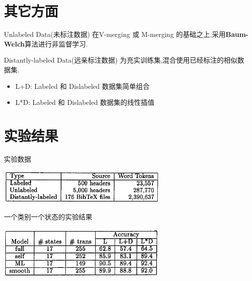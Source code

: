 \documentclass{beamer}
\begin{document}
\section{其它方面}
\begin{frame}
    \begin{block}{Unlabeled Data(未标注数据)}
        在V-merging 或 M-merging 的基础之上,采用\textbf{Baum-Welch}算法进行非监督学习. 
    \end{block}

    \begin{block}{ Distantly-labeled Data(远亲标注数据)}
        为充实训练集,混合使用已经标注的相似数据集. 
        \begin{itemize}
            \item L+D: Labeled 和 Dislabeled 数据集简单组合
            \item L*D: Labeled 和 Dislabeled 数据集的线性插值
        \end{itemize}
    \end{block}
\end{frame}

\section{实验结果}
\begin{frame}{实验数据}
    \begin{center}
        \includegraphics[width=240pt]{report5/traing_set.png}
    \end{center}
\end{frame}

\begin{frame}{一个类别一个状态的实验结果}
    \begin{center}
        \includegraphics[width=240pt]{report5/one_state_per_class.png}
    \end{center}
\end{frame}
\end{document}

